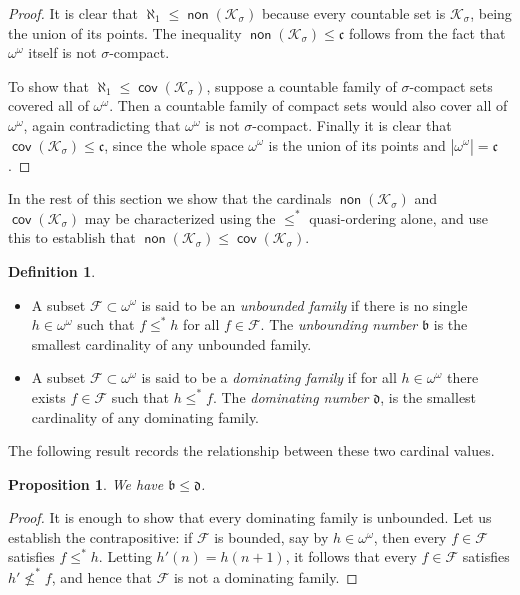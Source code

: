 \documentclass[11pt,oneside]{amsbook}
\newcommand{\Ksigma}{\mathcal K_\sigma}
\DeclareMathOperator{\non}{\mathsf{non}}
\DeclareMathOperator{\cov}{\mathsf{cov}}
\theoremstyle{definition}
\theoremstyle{plain}
\newtheorem{proposition}[theorem]{Proposition}
\theoremstyle{definition}
\newtheorem{definition}[theorem]{Definition}
\theoremstyle{remark}
\numberwithin{equation}{section}
\numberwithin{figure}{section}
\begin{document}
\begin{proof}
  It is clear that $\aleph_1\leq\non(\Ksigma)$ because every countable set is $\Ksigma$, being the union of its points. The inequality $\non(\Ksigma)\leq\mathfrak c$ follows from the fact that $\omega^\omega$ itself is not $\sigma$-compact.

  To show that $\aleph_1\leq\cov(\Ksigma)$, suppose a countable family of $\sigma$-compact sets covered all of $\omega^\omega$. Then a countable family of compact sets would also cover all of $\omega^\omega$, again contradicting that $\omega^\omega$ is not $\sigma$-compact. Finally it is clear that $\cov(\Ksigma)\leq\mathfrak c$, since the whole space $\omega^\omega$ is the union of its points and $|\omega^\omega|=\mathfrak c$.
\end{proof}

In the rest of this section we show that the cardinals $\non(\Ksigma)$ and $\cov(\Ksigma)$ may be characterized using the $\leq^*$ quasi-ordering alone, and use this to establish that $\non(\Ksigma)\leq\cov(\Ksigma)$.

\begin{definition}
  \begin{itemize}
  \item A subset $\mathcal F\subset\omega^\omega$ is said to be an \emph{unbounded family} if there is no single $h\in\omega^\omega$ such that $f\leq^*h$ for all $f\in\mathcal F$. The \emph{unbounding number} $\mathfrak b$ is the smallest cardinality of any unbounded family.
  \item A subset $\mathcal F\subset\omega^\omega$ is said to be a \emph{dominating family} if for all $h\in\omega^\omega$ there exists $f\in\mathcal F$ such that $h\leq^*f$. The \emph{dominating number} $\mathfrak d$, is the smallest cardinality of any dominating family.
  \end{itemize}
\end{definition}

The following result records the relationship between these two cardinal values.

\begin{proposition}
  \label{prop:bd}
  We have $\mathfrak{b}\leq\mathfrak{d}$.
\end{proposition}
	
\begin{proof}
  It is enough to show that every dominating family is unbounded. Let us establish the contrapositive: if $\mathcal F$ is bounded, say by $h\in\omega^\omega$, then every $f\in\mathcal F$ satisfies $f\leq^*h$. Letting $h'(n)=h(n+1)$, it follows that every $f\in\mathcal F$ satisfies $h'\not\leq^*f$, and hence that $\mathcal F$ is not a dominating family.
\end{proof}
\end{document}
